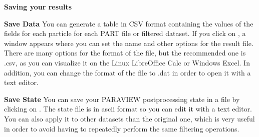 \documentclass{../GPUSPHtemplate}
\begin{document}
\textbf{Saving your results}

\textbf{Save Data}
You can generate a table in CSV format containing the values of the 
fields for each particle for each PART file or filtered dataset. 
If you click on , a window appears where 
you can set the name and other options for the result file. 
There are many options for the format of the file, but the recommended 
one is .csv, as you can visualize it on the Linux LibreOffice Calc 
or Windows Excel. In addition, 
you can change the format of the file to .dat in order to open 
it with a text editor. 

\textbf{Save State}
You can save your PARAVIEW postprocessing state in a file by
clicking on . The state file is in ascii
format so you can edit it with a text editor.
You can also apply it to other datasets than the original one, 
which is very useful in order to avoid having to repeatedly
perform the same filtering operations.


\end{document}
